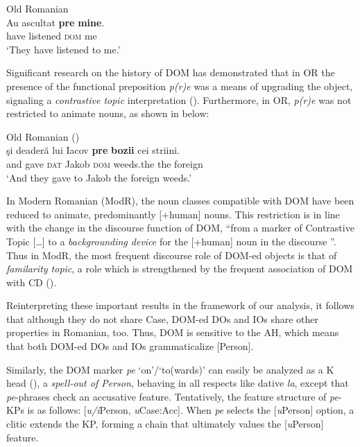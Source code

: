 \documentclass[output=paper,colorlinks,citecolor=brown,nonflat]{langsci/langscibook}
\begin{document}
\ea%
      \label{ex:cornilescu:19}
      Old Romanian \citep[395]{HillMardale2017}\\
      \gll Au  ascultat	\textbf{pre} \textbf{mine}.\\
            have listened \textsc{dom} me\\
      \glt ‘They have listened to me.’
      \z



Significant research on the history of DOM has demonstrated that in OR the presence of the functional preposition \textit{p(r)e} was a means of upgrading the object, signaling a \textit{contrastive topic} interpretation (\citealt{Hill2013, HillMardale2017}). Furthermore, in OR, \textit{p(r)e} was not restricted to animate nouns, as shown in  below:

\ea%
      \label{ex:cornilescu:20}
      Old Romanian  (\citealt[396]{HillMardale2017}) \\
      \gll  şi deaderă lui Iacov \textbf{pre} \textbf{bozii} cei striini.\\
             and gave \textsc{dat} Jakob \textsc{dom} weeds.the the foreign\\
      \glt ‘And they gave to Jakob the foreign weeds.’
      \z

In Modern Romanian (ModR), the noun classes compatible with DOM have been reduced to animate, predominantly [+human] nouns. This restriction is in line with the change in the discourse function of DOM, “from a marker of Contrastive Topic […] to a \textit{backgrounding device} for the [+human] noun in the discourse \citep[147]{Hill2013}”. Thus in ModR, the most frequent discourse role of DOM-ed objects is that of \textit{familarity topic}, a role which is strengthened by the frequent association of DOM with CD (\citealt{HillMardale2017}).

Reinterpreting these important results in the framework of our analysis, it follows that although they do not share Case, DOM-ed DOs and IOs share other properties in Romanian, too. Thus, DOM is sensitive to the AH, which means that both DOM-ed DOs and IOs grammaticalize [Person].

Similarly, the DOM marker \textit{pe} ‘on’/‘to(wards)’ can easily be analyzed as a K head (\citealt{López2012, HillMardale2017}), a \textit{spell-out of Person}, behaving in all respects like dative \textit{la}, except that \textit{pe}{}-phrases check an accusative feature. Tentatively, the feature structure of \textit{pe}-KPs is as follows: [\textit{u/i}Person, \textit{u}Case:Acc]. When \textit{pe} selects the [\textit{u}Person] option, a clitic extends the KP, forming a chain that ultimately values the [\textit{u}Person] feature.
\end{document}
